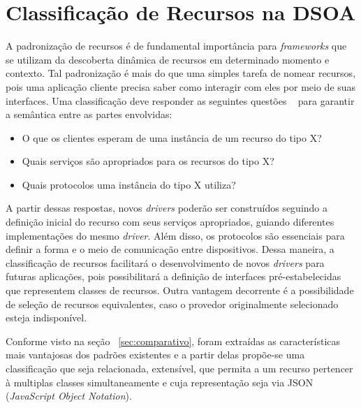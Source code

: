 \chapter{Classificação de Recursos na DSOA}

A padronização de recursos é de fundamental importância para \emph{frameworks} que se utilizam da descoberta dinâmica de recursos em determinado momento e contexto. Tal padronização é mais do que uma simples tarefa de nomear recursos, pois uma aplicação cliente precisa saber como interagir com eles por meio de suas interfaces. Uma classificação deve responder as seguintes questões ~\cite{pervasiveComputing} para garantir a semântica entre as partes envolvidas:

\begin{itemize}
	\item O que os clientes esperam de uma instância de um recurso do tipo X?

	\item Quais serviços são apropriados para os recursos do tipo X?

	\item Quais protocolos uma instância do tipo X utiliza?
\end{itemize}

A partir dessas respostas, novos \emph{drivers} poderão ser construídos seguindo a definição inicial do recurso com seus serviços apropriados, guiando diferentes implementações do mesmo \emph{driver}. Além disso, os protocolos são essenciais para definir a forma e o meio de comunicação entre dispositivos. Dessa maneira, a classificação de recursos facilitará o desenvolvimento de novos \emph{drivers} para futuras aplicações, pois possibilitará a definição de interfaces pré-estabelecidas que representem classes de recursos. Outra vantagem decorrente é a possibilidade de seleção de recursos equivalentes, caso o provedor originalmente selecionado esteja indisponível.

Conforme visto na seção ~\ref{sec:comparativo}, foram extraídas as características mais vantajosas dos padrões existentes e a partir delas propõe-se uma classificação que seja relacionada, extensível, que permita a um recurso pertencer à multiplas classes simultaneamente e cuja representação seja via JSON (\emph{JavaScript Object Notation}).

\begin{comment}
Neste capítulo falaremos sobre a classificação de dispositivos proposta. Essa classificação deverá ser relacionada, extensível e um dispositivo deverá poder fazer parte de múltiplas classes. A classificação relacionada facilita a implementação de novos \emph{drivers} para o \emph{uOS} que poderão se aproveitar das interfaces já existentes. Ser extensível, pois permite uma relação de especialização entre diferentes classes. A capacidade de permitir que um dispositivo pertença à diferentes classes, garante uma flexibilidade para dispositivos com diversos recursos poderem se encaixar nas classificações padrões sem a necessidade da definição de uma nova classe.
\end{comment}

